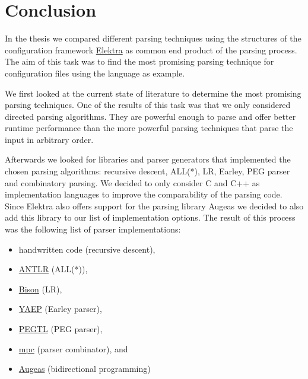 \chapter{Conclusion}

%
%
%

In the thesis we compared different parsing techniques using the  structures of the configuration framework \href{https://www.libelektra.org}{Elektra} as common end product of the parsing process. The aim of this task was to find the most promising parsing technique for configuration files using the language  as example.

We first looked at the current state of literature to determine the most promising parsing techniques. One of the results of this task was that we only considered directed parsing algorithms. They are powerful enough to parse  and offer better runtime performance than the more powerful parsing techniques that parse the input in arbitrary order.

Afterwards we looked for libraries and parser generators that implemented the chosen parsing algorithms: recursive descent, \gls{ALL(*)}, LR, Earley, \gls{PEG} parser and combinatory parsing. We decided to only consider C and C++ as implementation languages to improve the comparability of the parsing code. Since Elektra also offers support for the parsing library Augeas we decided to also add this library to our list of implementation options. The result of this process was the following list of parser implementations:

\begin{itemize}
  \item handwritten code (recursive descent),
  \item \href{http://www.antlr.org}{ANTLR} (\gls{ALL(*)}),
  \item \href{https://www.gnu.org/software/bison}{Bison} (LR),
  \item \href{https://github.com/vnmakarov/yaep}{YAEP} (Earley parser),
  \item \href{https://github.com/taocpp/PEGTL}{PEGTL} (PEG parser),
  \item \href{https://github.com/orangeduck/mpc}{mpc} (parser combinator), and
  \item \href{http://augeas.net}{Augeas} (bidirectional programming)
\end{itemize}

